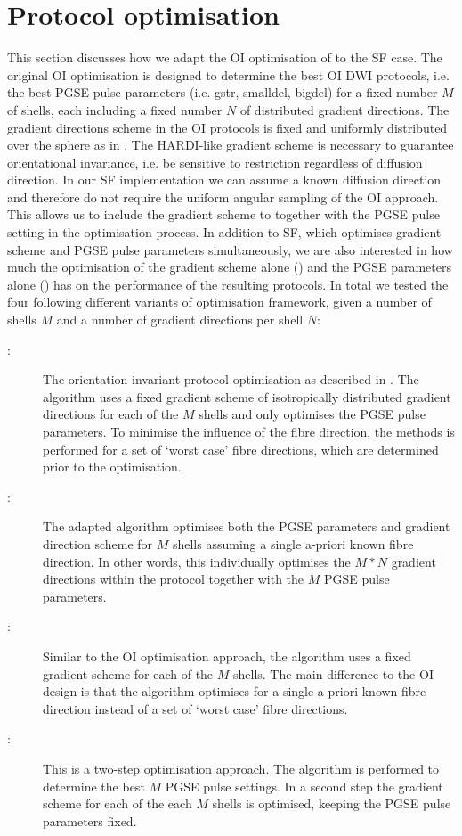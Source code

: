 \section{Protocol optimisation}
\label{sec:chapter 7 four SF optimisations}
This section discusses how we adapt the \gls{OI} optimisation of \citet{Alexander:2008} to the \gls{SF} case. The original \gls{OI} optimisation is designed to determine the best \gls{OI}{} DWI protocols, i.e. the best PGSE pulse parameters (i.e. \gls{gstr}, \gls{smalldel}, \gls{bigdel}) for a fixed number $M$ of shells, each including a fixed number $N$ of distributed gradient directions. The gradient directions scheme in the \gls{OI}{} protocols is fixed and uniformly distributed over the sphere as in \citep{Cook:2007}. The HARDI-like gradient scheme is necessary to guarantee orientational invariance, i.e. be sensitive to restriction regardless of diffusion direction. In our \gls{SF} implementation we can assume a known diffusion direction and therefore do not require the uniform angular sampling of the \gls{OI} approach. This allows us to include the gradient scheme to together with the PGSE pulse setting in the optimisation process. In addition to \gls{SF}, which optimises gradient scheme and PGSE pulse parameters simultaneously, we are also interested in how much the optimisation of the gradient scheme alone ({\DO}) and the PGSE parameters alone ({\SD}) has on the performance of the resulting protocols. In total we tested the four following different variants of  optimisation framework, given a number of shells $M$ and a number of gradient directions per shell $N$:

\begin{description}
	\item[\OI:] The orientation invariant protocol optimisation as described in \citep{Alexander:2008}. The algorithm uses a fixed gradient scheme of  isotropically distributed gradient directions for each of the $M$ shells and only optimises the PGSE pulse parameters. To minimise the influence of the fibre direction, the methods is performed for a set of \lq worst case\rq{} fibre directions, which are determined prior to the optimisation.
	\item[\FD:] The adapted algorithm optimises both the PGSE parameters and gradient direction scheme for $M$ shells assuming a single a-priori known fibre direction. In other words, this individually optimises the $M*N$ gradient directions within the protocol together with the $M$ PGSE pulse parameters.
\item[\SD:] Similar to the {\gls{OI}} optimisation approach, the algorithm uses a fixed gradient scheme for each of the $M$ shells. The main difference to the \gls{OI}{} design is that the algorithm optimises for a single a-priori known fibre direction instead of a set of \lq worst case\rq{} fibre directions.
	\item[\DO:] This is a two-step optimisation approach. The {\SD} algorithm is performed to determine the best $M$ PGSE pulse settings. In a second step the gradient scheme for each of the each $M$ shells is optimised, keeping the PGSE pulse parameters fixed.
\end{description}

